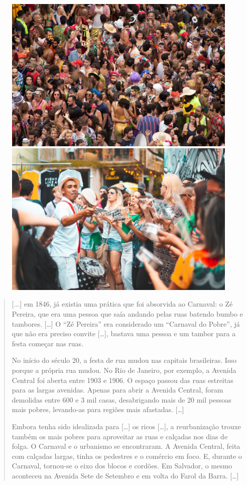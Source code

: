 \begin{figure}[htpb!]
\includegraphics[width=.5\textwidth]{./imgs/img39.png}
\includegraphics[width=.5\textwidth]{./imgs/img40.png}
\end{figure}

\begin{quote}
{[}...{]} em 1846, já existia uma prática que foi absorvida ao Carnaval: o Zé
Pereira, que era uma pessoa que saía andando pelas ruas batendo bumbo e
tambores. {[}\ldots{}{]} O “Zé
Pereira” era considerado um “Carnaval do Pobre”, já que não era
preciso convite {[}\ldots{}{]}, bastava uma pessoa e um tambor
para a festa começar nas ruas.

No início do século 20, a festa de rua mudou nas capitais brasileiras.
Isso porque a própria rua mudou. No Rio de Janeiro, por exemplo, a
Avenida Central foi aberta entre 1903 e 1906. O espaço passou das ruas
estreitas para as largas avenidas. Apenas para abrir a Avenida Central,
foram demolidas entre 600 e 3 mil casas, desabrigando mais de 20 mil
pessoas mais pobres, levando-as para regiões mais afastadas. {[}\ldots{}{]}

Embora tenha sido idealizada para {[}\ldots{}{]} os ricos {[}\ldots{}{]}, a reurbanização trouxe também os mais pobres para aproveitar
as ruas e calçadas nos dias de folga. O Carnaval e o urbanismo se
encontraram. A Avenida Central, feita com calçadas largas, tinha os
pedestres e o comércio em foco. E, durante o Carnaval, tornou-se o eixo
dos blocos e cordões. Em Salvador, o mesmo aconteceu na Avenida Sete de
Setembro e em volta do Farol da Barra. {[}\ldots{}{]}

\end{quote}

